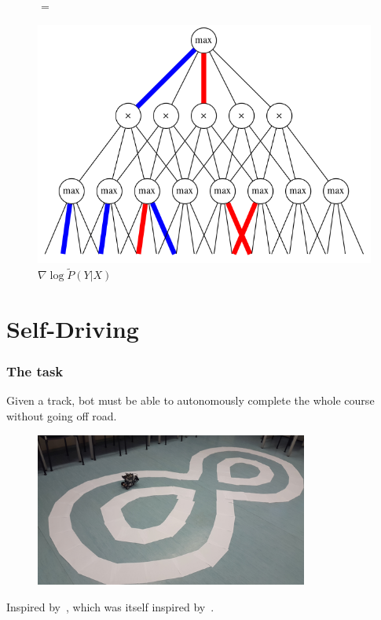 \documentclass{beamer}
\newcommand{\ddspn}[2]{\frac{\partial#1}{\partial#2}}
\begin{document}
\begin{frame}
\begin{figure}[h]
\begin{minipage}{0.3\textwidth}
      \captionsetup{justification=centering}
      \caption*{$\ddspn{}{W}\log M(X)$}
    \end{minipage}
    $=$
    \begin{minipage}{0.3\textwidth}
      \includegraphics[width=\linewidth]{imgs/hard_diff_2.png}
      \captionsetup{justification=centering}
      \caption*{$\nabla\log\tilde{P}(Y|X)$}
    \end{minipage}
  \end{figure}
\end{frame}

\section{Self-Driving}

\begin{frame}
  \frametitle{The task}

  Given a track, bot must be able to autonomously complete the whole course without going off road.

  \begin{figure}[h]
    \centering\includegraphics[width=0.8\textwidth]{imgs/track_1.png}
  \end{figure}

  Inspired by~\cite{self-driving}, which was itself inspired by~\cite{nvidia-driving}.
\end{frame}
\end{document}
